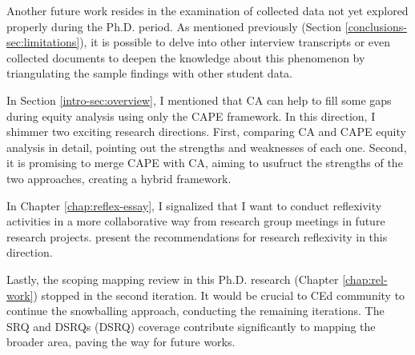 Another future work resides in the examination of collected data not yet explored properly during the \gls{Ph.D.} period. As mentioned previously (Section \ref{conclusions-sec:limitations}), it is possible to delve into other interview transcripts or even collected documents to deepen the knowledge about this phenomenon by triangulating the sample findings with other student data. 

In Section \ref{intro-sec:overview}, I mentioned that \gls{CA} can help to fill some gaps during equity analysis using only the
\gls{CAPE} framework. In this direction, I shimmer two exciting research directions. First, comparing \gls{CA} and \gls{CAPE} equity analysis in detail, pointing out the strengths and weaknesses of each one. Second, it is promising to merge \gls{CAPE} with \gls{CA}, aiming to usufruct the strengths of the two approaches, creating a hybrid framework.

In Chapter \ref{chap:reflex-essay}, I signalized that I want to conduct reflexivity activities in a more collaborative way from research group meetings in future research projects.  present the recommendations for research reflexivity in this direction.

Lastly, the scoping mapping review in this \gls{Ph.D.} research (Chapter \ref{chap:rel-work}) stopped in the second iteration. It would be crucial to \gls{CEd} community to continue the snowballing approach, conducting the remaining iterations. The \acrfull{SRQ} and \acrlong{DSRQ}s (\acrshort{DSRQ}) coverage contribute significantly to mapping the broader area, paving the way for future works.



                

        

